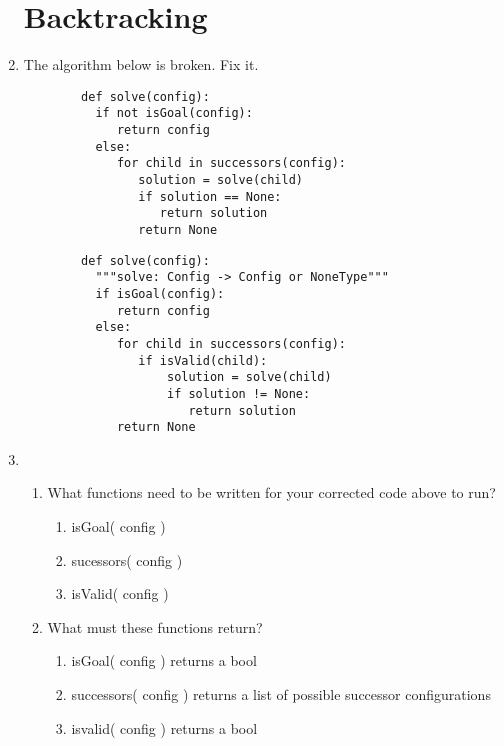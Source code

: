 \documentclass[11pt]{article}
\newenvironment{answer}{\large\lstset{basicstyle=\large}\color{white}}{}
\newenvironment{answer}{\large\lstset{basicstyle=\large}\color{red}}{}
\begin{document}
\begin{enumerate}
\section*{Backtracking}
    \item The algorithm below is broken. Fix it.
    \begin{lstlisting}
        def solve(config):
          if not isGoal(config):
             return config
          else:
             for child in successors(config):
                solution = solve(child)
                if solution == None:
                   return solution
                return None
    \end{lstlisting}        
    \begin{answer}
    \begin{lstlisting}
        def solve(config):
          """solve: Config -> Config or NoneType"""
          if isGoal(config):
             return config
          else:
             for child in successors(config):
                if isValid(child):
                    solution = solve(child)
                    if solution != None:
                       return solution
             return None
    \end{lstlisting}
    \end{answer}
    
    \item
    \begin {enumerate}
        \item What functions need to be written for your corrected code above to run? 
            \begin{answer}
                \begin{enumerate}
                  \item isGoal( config )
                  \item sucessors( config )
                  \item isValid( config )
                \end{enumerate}
            \end{answer}
        \item What must these functions return?
            \begin{answer}
                \begin{enumerate}
                    \item isGoal( config ) returns a bool
                    \item successors( config ) returns a list of possible successor configurations
                    \item isvalid( config ) returns a bool
                \end{enumerate}
            \end{answer}
    \end{enumerate}

\end{enumerate}
\end{document}
